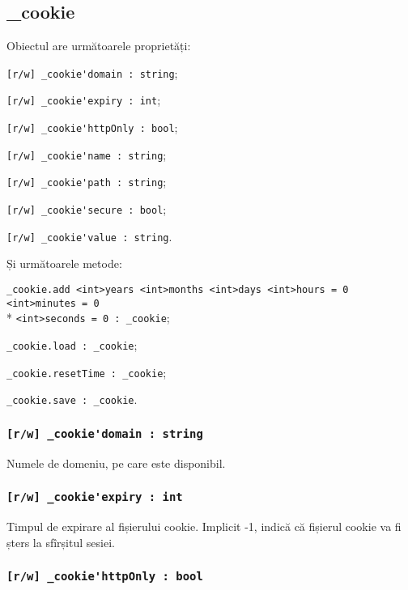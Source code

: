 \subsection{{\color{orange} \_cookie}}

Obiectul \cookie{} are următoarele proprietăți:
\begin{icItems}
	\item \lstinline|[r/w] _cookie'domain : string|;
	\item \lstinline|[r/w] _cookie'expiry : int|;
	\item \lstinline|[r/w] _cookie'httpOnly : bool|;
	\item \lstinline|[r/w] _cookie'name : string|;
	\item \lstinline|[r/w] _cookie'path : string|;
	\item \lstinline|[r/w] _cookie'secure : bool|;
	\item \lstinline|[r/w] _cookie'value : string|.
\end{icItems}

Și următoarele metode:
\begin{icItems}
	\item \lstinline|_cookie.add <int>years <int>months <int>days <int>hours = 0 <int>minutes = 0|\\* \lstinline|<int>seconds = 0 : _cookie|;
	\item \lstinline|_cookie.load : _cookie|;
	\item \lstinline|_cookie.resetTime : _cookie|;
	\item \lstinline|_cookie.save : _cookie|.
\end{icItems}

\subsubsection{\lstinline|[r/w] _cookie'domain : string|}

Numele de domeniu, pe care \cookie{} este disponibil.

\subsubsection{\lstinline|[r/w] _cookie'expiry : int|}

Timpul de expirare al fișierului cookie. Implicit -1, indică că fișierul cookie va fi șters la sfîrșitul sesiei.

\subsubsection{\lstinline|[r/w] _cookie'httpOnly : bool|}

